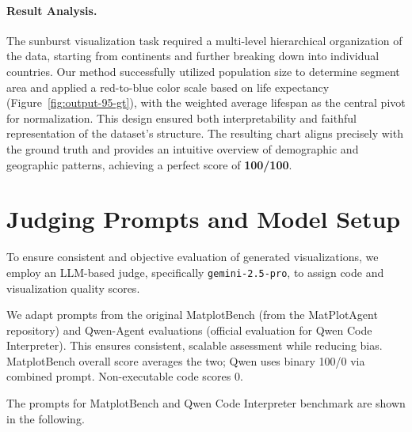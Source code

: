 \documentclass[11pt, a4paper, logo, copyright]{googlecloud}
\newcommand{\io}[1]{\setlength{\fboxsep}{1pt}\colorbox{gray!10}{\texttt{#1}}}
\begin{document}
\paragraph{Result Analysis.}
The sunburst visualization task required a multi-level hierarchical organization of the data, 
starting from continents and further breaking down into individual countries. Our method 
successfully utilized population size to determine segment area and applied a red-to-blue 
color scale based on life expectancy (Figure~\ref{fig:output-95-gt}), with the weighted average lifespan as the central pivot 
for normalization. This design ensured both interpretability and faithful representation of 
the dataset’s structure. The resulting chart aligns precisely with the ground truth and 
provides an intuitive overview of demographic and geographic patterns, achieving a perfect 
score of \textbf{100/100}.

\section{Judging Prompts and Model Setup}\label{appendix:eval-prompts}

To ensure consistent and objective evaluation of generated visualizations, we employ an LLM-based judge, specifically \io{gemini-2.5-pro}, to assign code and visualization quality scores. 

We adapt prompts from the original MatplotBench (from the MatPlotAgent repository) and Qwen-Agent evaluations (official evaluation for Qwen Code Interpreter). This ensures consistent, scalable assessment while reducing bias.
MatplotBench overall score averages the two; Qwen uses binary 100/0 via combined prompt. Non-executable code scores 0.

The prompts for MatplotBench and Qwen Code Interpreter benchmark are shown in the following.
\end{document}
